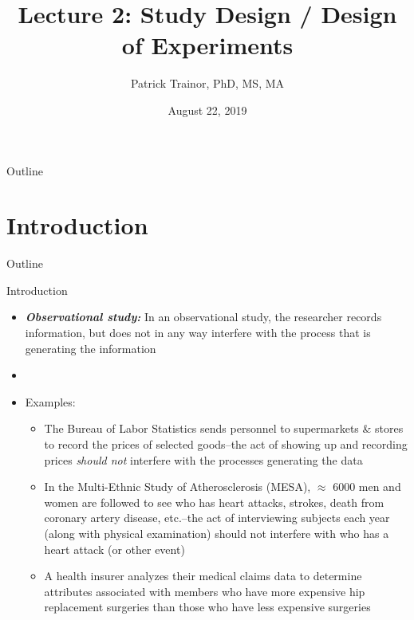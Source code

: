 \documentclass[xcolor=dvipsnames]{beamer}
\title[Lecture 2]{Lecture 2: Study Design / Design of Experiments}
\author[Patrick Trainor]{Patrick Trainor, PhD, MS, MA}
\institute[NMSU]{New Mexico State University}
\date{August 22, 2019}
\begin{document}
\begin{frame}
\maketitle
\end{frame}

\begin{frame}{Outline}
\tableofcontents[hideallsubsections]
\end{frame}

\section{Introduction}
\begin{frame}{Outline}
\tableofcontents[currentsection,subsectionstyle=show/shaded/hide]
\end{frame}

\begin{frame}{Introduction}
	\begin{itemize}
		\item \textbf{\emph{Observational study:}} In an observational study, the researcher records information, but does not in any way interfere with the process that is generating the information \pause
		\item[]
		\item Examples: \pause
		\begin{itemize}
			\item The Bureau of Labor Statistics sends personnel to supermarkets \& stores to record the prices of selected goods--the act of showing up and recording prices \emph{should not} interfere with the processes generating the data \pause
			\item In the Multi-Ethnic Study of Atherosclerosis (MESA), $\approx$ 6000 men and women are followed to see who has heart attacks, strokes, death from coronary artery disease, etc.--the act of interviewing subjects each year (along with physical examination) should not interfere with who has a heart attack (or other event) \pause
			\item A health insurer analyzes their medical claims data to determine attributes associated with members who have more expensive hip replacement surgeries than those who have less expensive surgeries
		\end{itemize}
	\end{itemize}
\end{frame}
\end{document}
